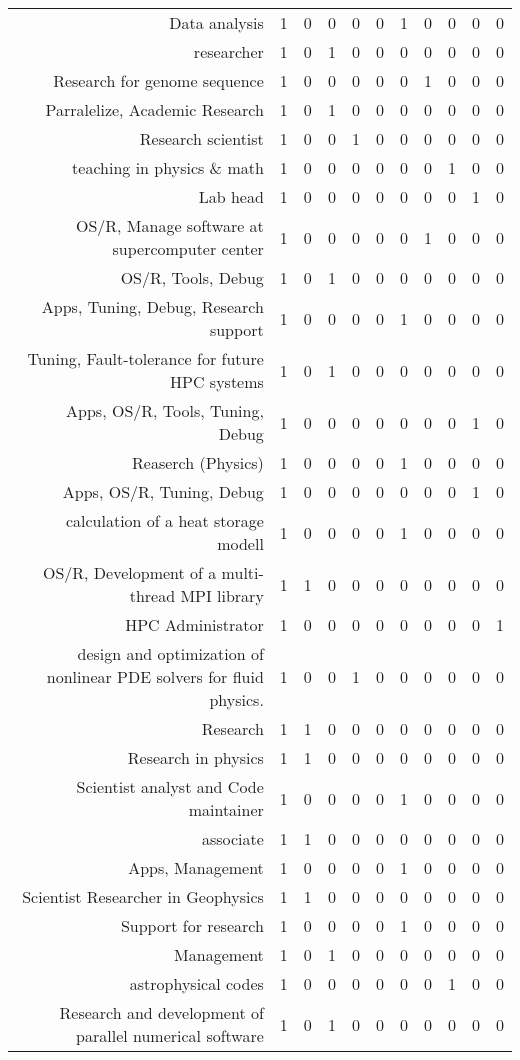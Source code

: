 {\begin{landscape}
\begin{longtable}[htb]{r|c|c|c|c|c|c|c|c|c|c}
{Data analysis} & 1 & 0 & 0 & 0 & 0 & 1 & 0 & 0 & 0 & 0 \\%
{researcher} & 1 & 0 & 1 & 0 & 0 & 0 & 0 & 0 & 0 & 0 \\%
{Research for genome sequence} & 1 & 0 & 0 & 0 & 0 & 0 & 1 & 0 & 0 & 0 \\%
{Parralelize, Academic Research} & 1 & 0 & 1 & 0 & 0 & 0 & 0 & 0 & 0 & 0 \\%
{Research scientist} & 1 & 0 & 0 & 1 & 0 & 0 & 0 & 0 & 0 & 0 \\%
{teaching in physics \& math} & 1 & 0 & 0 & 0 & 0 & 0 & 0 & 1 & 0 & 0 \\%
{Lab head} & 1 & 0 & 0 & 0 & 0 & 0 & 0 & 0 & 1 & 0 \\%
{OS/R, Manage software at supercomputer center} & 1 & 0 & 0 & 0 & 0 & 0 & 1 & 0 & 0 & 0 \\%
{OS/R, Tools, Debug} & 1 & 0 & 1 & 0 & 0 & 0 & 0 & 0 & 0 & 0 \\%
{Apps, Tuning, Debug, Research support} & 1 & 0 & 0 & 0 & 0 & 1 & 0 & 0 & 0 & 0 \\%
{Tuning, Fault-tolerance for future HPC systems} & 1 & 0 & 1 & 0 & 0 & 0 & 0 & 0 & 0 & 0 \\%
{Apps, OS/R, Tools, Tuning, Debug} & 1 & 0 & 0 & 0 & 0 & 0 & 0 & 0 & 1 & 0 \\%
{Reaserch (Physics)} & 1 & 0 & 0 & 0 & 0 & 1 & 0 & 0 & 0 & 0 \\%
{Apps, OS/R, Tuning, Debug} & 1 & 0 & 0 & 0 & 0 & 0 & 0 & 0 & 1 & 0 \\%
{calculation of a heat storage modell} & 1 & 0 & 0 & 0 & 0 & 1 & 0 & 0 & 0 & 0 \\%
{OS/R, Development of a  multi-thread MPI library} & 1 & 1 & 0 & 0 & 0 & 0 & 0 & 0 & 0 & 0 \\%
{HPC Administrator} & 1 & 0 & 0 & 0 & 0 & 0 & 0 & 0 & 0 & 1 \\%
{design and optimization of nonlinear PDE solvers for fluid physics.} & 1 & 0 & 0 & 1 & 0 & 0 & 0 & 0 & 0 & 0 \\%
{Research} & 1 & 1 & 0 & 0 & 0 & 0 & 0 & 0 & 0 & 0 \\%
{Research in physics} & 1 & 1 & 0 & 0 & 0 & 0 & 0 & 0 & 0 & 0 \\%
{Scientist analyst and Code maintainer} & 1 & 0 & 0 & 0 & 0 & 1 & 0 & 0 & 0 & 0 \\%
{associate} & 1 & 1 & 0 & 0 & 0 & 0 & 0 & 0 & 0 & 0 \\%
{Apps, Management} & 1 & 0 & 0 & 0 & 0 & 1 & 0 & 0 & 0 & 0 \\%
{Scientist Researcher in Geophysics} & 1 & 1 & 0 & 0 & 0 & 0 & 0 & 0 & 0 & 0 \\%
{Support for research} & 1 & 0 & 0 & 0 & 0 & 1 & 0 & 0 & 0 & 0 \\%
{Management} & 1 & 0 & 1 & 0 & 0 & 0 & 0 & 0 & 0 & 0 \\%
{astrophysical codes} & 1 & 0 & 0 & 0 & 0 & 0 & 0 & 1 & 0 & 0 \\%
{Research and development of parallel numerical software} & 1 & 0 & 1 & 0 & 0 & 0 & 0 & 0 & 0 & 0 \\%
\hline%
\end{longtable}%
\end{landscape}}%
\clearpage%
